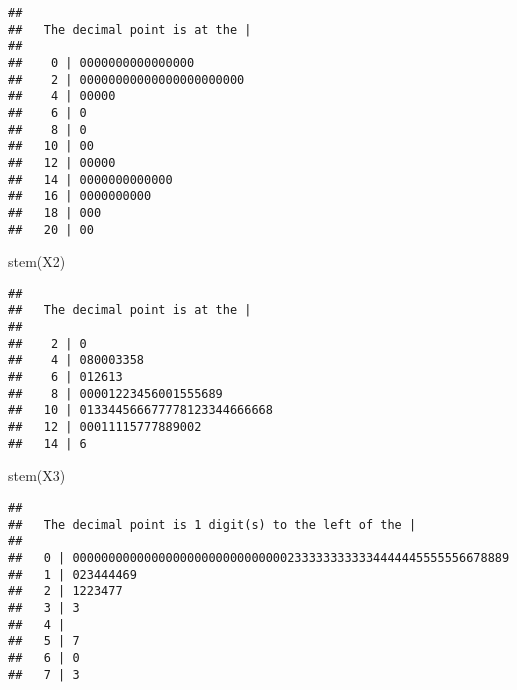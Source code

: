 \documentclass[
]{article}
\newenvironment{Shaded}{\begin{snugshade}}{\end{snugshade}}
\newcommand{\AttributeTok}[1]{\textcolor[rgb]{0.77,0.63,0.00}{#1}}
\newcommand{\ConstantTok}[1]{\textcolor[rgb]{0.00,0.00,0.00}{#1}}
\newcommand{\DecValTok}[1]{\textcolor[rgb]{0.00,0.00,0.81}{#1}}
\newcommand{\FunctionTok}[1]{\textcolor[rgb]{0.00,0.00,0.00}{#1}}
\newcommand{\NormalTok}[1]{#1}
\newcommand{\OtherTok}[1]{\textcolor[rgb]{0.56,0.35,0.01}{#1}}
\newcommand{\SpecialCharTok}[1]{\textcolor[rgb]{0.00,0.00,0.00}{#1}}
\newcommand{\StringTok}[1]{\textcolor[rgb]{0.31,0.60,0.02}{#1}}
\begin{document}
\begin{Shaded}
\end{Shaded}

\begin{verbatim}
## 
##   The decimal point is at the |
## 
##    0 | 0000000000000000
##    2 | 00000000000000000000000
##    4 | 00000
##    6 | 0
##    8 | 0
##   10 | 00
##   12 | 00000
##   14 | 0000000000000
##   16 | 0000000000
##   18 | 000
##   20 | 00
\end{verbatim}

\begin{Shaded}
\begin{Highlighting}[]
\FunctionTok{stem}\NormalTok{(X2)}
\end{Highlighting}
\end{Shaded}

\begin{verbatim}
## 
##   The decimal point is at the |
## 
##    2 | 0
##    4 | 080003358
##    6 | 012613
##    8 | 00001223456001555689
##   10 | 013344566677778123344666668
##   12 | 00011115777889002
##   14 | 6
\end{verbatim}

\begin{Shaded}
\begin{Highlighting}[]
\FunctionTok{stem}\NormalTok{(X3)}
\end{Highlighting}
\end{Shaded}

\begin{verbatim}
## 
##   The decimal point is 1 digit(s) to the left of the |
## 
##   0 | 0000000000000000000000000000002333333333334444445555556678889
##   1 | 023444469
##   2 | 1223477
##   3 | 3
##   4 | 
##   5 | 7
##   6 | 0
##   7 | 3
\end{verbatim}
\end{document}
